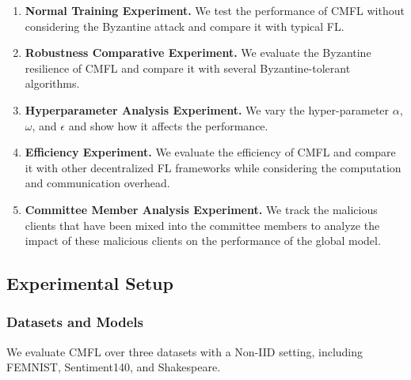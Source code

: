 \documentclass[10pt,journal,compsoc]{IEEEtran}
\begin{document}
\begin{enumerate}
  \item \textbf{Normal Training Experiment.} We test the performance of CMFL without considering the Byzantine attack and compare it with typical FL.
  \item \textbf{Robustness Comparative Experiment.} We evaluate the Byzantine resilience of CMFL and compare it with several Byzantine-tolerant algorithms. 
  \item \textbf{Hyperparameter Analysis Experiment.} We vary the hyper-parameter $\alpha$, $\omega$, and $\epsilon$ and show how it affects the performance.
  \item \textbf{Efficiency Experiment.} We evaluate the efficiency of CMFL and compare it with other decentralized FL frameworks while considering the computation and communication overhead.
  \item \textbf{Committee Member Analysis Experiment.} We track the malicious clients that have been mixed into the committee members to analyze the impact of these malicious clients on the performance of the global model. 
\end{enumerate}
  


\subsection{Experimental Setup} \label{setup}

\subsubsection{Datasets and Models}

{We evaluate CMFL over three datasets with a Non-IID setting, including FEMNIST, Sentiment140, and Shakespeare.}
\end{document}
